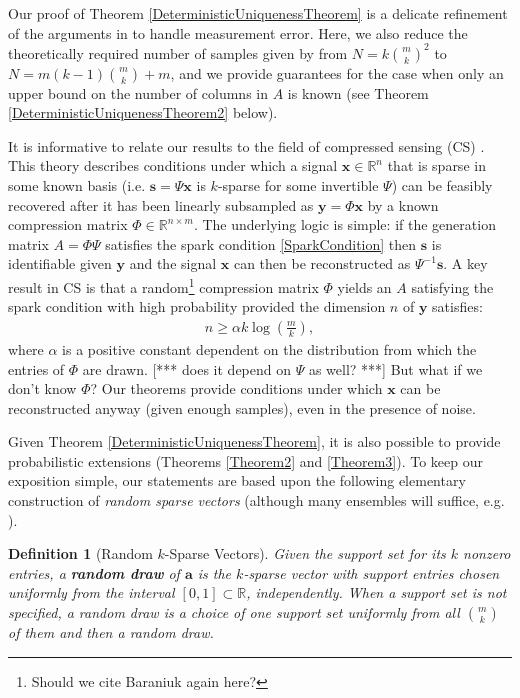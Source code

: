 \documentclass[journal, onecolumn]{IEEEtran}
\newtheorem{definition}{Definition}
\begin{document}
Our proof of Theorem \ref{DeterministicUniquenessTheorem} is a delicate refinement of the arguments in \cite{Hillar15} to handle measurement error.  Here, we also reduce the theoretically required number of samples given by \cite{Hillar15} from $N=k{m \choose k}^2$ to $N = m(k-1){m \choose k}+m$, and we provide guarantees for the case when only an upper bound on the number of columns in $A$ is known (see Theorem \ref{DeterministicUniquenessTheorem2} below). 

It is informative to relate our results to the field of compressed sensing (CS) \cite{candes2006near, donoho2006compressed, candes2006stable}. This theory describes conditions under which a signal $\mathbf{x} \in \mathbb{R}^n$ that is sparse in some known basis (i.e. $\mathbf{s} = \Psi \mathbf{x}$ is $k$-sparse for some invertible $\Psi$) can be feasibly recovered after it has been linearly subsampled as $\mathbf{y} = \Phi \mathbf{x}$ by a known compression matrix $\Phi \in \mathbb{R}^{n \times m}$. The underlying logic is simple: if the generation matrix $A = \Phi\Psi$ satisfies the spark condition \eqref{SparkCondition} then $\mathbf{s}$ is identifiable given $\mathbf{y}$ and the signal $\mathbf{x}$ can then be reconstructed as $\Psi^{-1}\mathbf{s}$. A key result in CS is that a random\footnote{Should we cite Baraniuk again here?} compression matrix $\Phi$ yields an $A$ satisfying the spark condition with high probability provided the dimension $n$ of $\mathbf{y}$ satisfies:
\begin{align}\label{CScondition}
n \geq \alpha k\log\left(\frac{m}{k}\right),
\end{align}
where $\alpha$ is a positive constant dependent on the distribution from which the entries of $\Phi$ are drawn. [*** does it depend on $\Psi$ as well? ***] But what if we don't know $\Phi$? Our theorems provide conditions under which $\mathbf{x}$ can be reconstructed anyway (given enough samples), even in the presence of noise. 

Given Theorem \ref{DeterministicUniquenessTheorem}, it is also possible to provide probabilistic extensions (Theorems \ref{Theorem2} and \ref{Theorem3}).  To keep our exposition simple, our statements are based upon the following elementary construction of \emph{random sparse vectors} (although many ensembles will suffice, e.g. \cite[Sec.~\S 4]{baraniuk2008simple}).

\begin{definition}[Random $k$-Sparse Vectors]\label{RandomDraw}
Given the support set for its $k$ nonzero entries, a \textbf{random draw} of $\mathbf{a}$ is the $k$-sparse vector with support entries chosen uniformly from the interval $[0, 1] \subset \mathbb{R}$, independently. When a support set is not specified, a random draw is a choice of one support set uniformly from all ${m \choose k}$ of them and then a random draw.
\end{definition}
\end{document}
